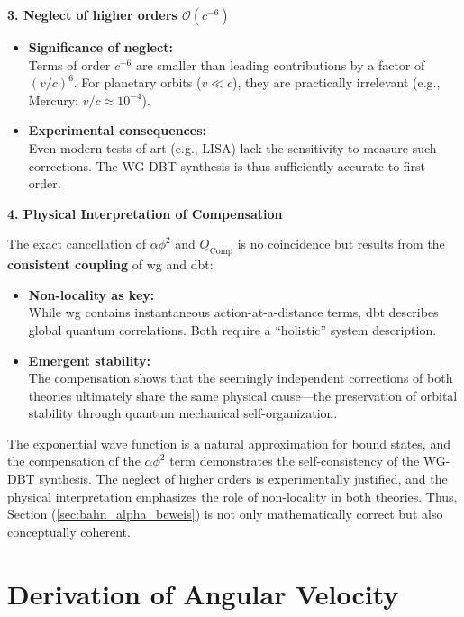 \textbf{3. Neglect of higher orders $\mathcal{O}(c^{-6})$}

\begin{itemize}
    \item \textbf{Significance of neglect:}\\Terms of order $c^{-6}$ are smaller than leading contributions by a factor of $(v/c)^{6}$. For planetary orbits ($v \ll c$), they are practically irrelevant (e.g., Mercury: $v/c \approx 10^{-4}$).
    \item \textbf{Experimental consequences:}\\Even modern tests of \gls{art} (e.g., LISA) lack the sensitivity to measure such corrections. The WG-DBT synthesis is thus sufficiently accurate to first order.
\end{itemize}

\textbf{4. Physical Interpretation of Compensation}

The exact cancellation of $\alpha \phi^{2}$ and $Q_\text{Comp}$ is no coincidence but results from the \textbf{consistent coupling} of \gls{wg} and \gls{dbt}:
\begin{itemize}
    \item \textbf{Non-locality as key:}\\While \gls{wg} contains instantaneous action-at-a-distance terms, \gls{dbt} describes global quantum correlations. Both require a \enquote{holistic} system description.
    \item \textbf{Emergent stability:}\\The compensation shows that the seemingly independent corrections of both theories ultimately share the same physical cause—the preservation of orbital stability through quantum mechanical self-organization.
\end{itemize}

The exponential wave function is a natural approximation for bound states, and the compensation of the $\alpha \phi^{2}$ term demonstrates the self-consistency of the WG-DBT synthesis.
The neglect of higher orders is experimentally justified, and the physical interpretation emphasizes the role of non-locality in both theories. Thus,
Section (\ref{sec:bahn_alpha_beweis}) is not only mathematically correct but also conceptually coherent.

\section{Derivation of Angular Velocity}
\label{sec:angular_velocity}

